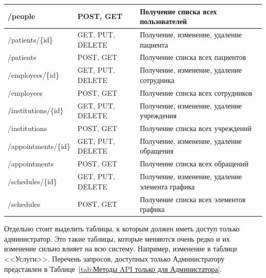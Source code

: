 \documentclass[a4paper,article]{article}
\begin{document}
\begin{sloppypar}
\begin{xltabular}{\textwidth} { |
        >{\hsize} X |
        >{\hsize} X |
        >{\hsize} X | }
        \hline
        /people
        & POST, GET
        & Получение списка всех пользователей \\

        \hline
        /patients/\{id\}
        & GET, PUT, DELETE
        & Получение, изменение, удаление пациента \\

        \hline
        /patients
        & POST, GET
        & Получение списка всех пациентов \\

        \hline
        /employees/\{id\}
        & GET, PUT, DELETE
        & Получение, изменение, удаление сотрудника \\

        \hline
        /employees
        & POST, GET
        & Получение списка всех сотрудников \\

        \hline
        /institutions/\{id\}
        & GET, PUT, DELETE
        & Получение, изменение, удаление учреждения  \\

        \hline
        /institutions
        & POST, GET
        & Получение списка всех учреждений \\

        \hline
        /appointments/\{id\}
        & GET, PUT, DELETE
        & Получение, изменение, удаление обращения \\

        \hline
        /appointments
        & POST, GET
        & Получение списка всех обращений \\

        \hline
        /schedules/\{id\}
        & GET, PUT, DELETE
        & Получение, изменение, удаление элемента графика \\

        \hline
        /schedules
        & POST, GET
        & Получение списка всех элементов графика \\

        \hline
    \end{xltabular}

    Отдельно стоит выделить таблицы, к которым должен иметь доступ только администратор. Это такие таблицы, которые меняются очень редко и их изменение сильно влияет на всю систему. Например, изменение в таблице <<Услуги>>. Перечень запросов, доступных только Администратору представлен в Таблице~\ref{tab:Методы API только для Администатора}.
    

\end{sloppypar}
\end{document}
